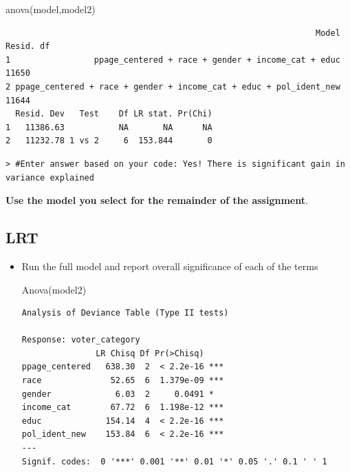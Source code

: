 \documentclass[
  letterpaper,
  DIV=11,
  numbers=noendperiod]{scrartcl}
\newenvironment{Shaded}{\begin{snugshade}}{\end{snugshade}}
\newcommand{\FunctionTok}[1]{\textcolor[rgb]{0.28,0.35,0.67}{#1}}
\newcommand{\NormalTok}[1]{\textcolor[rgb]{0.00,0.23,0.31}{#1}}
\begin{document}
\begin{Shaded}
\begin{Highlighting}[]
\FunctionTok{anova}\NormalTok{(model,model2)}
\end{Highlighting}
\end{Shaded}

\begin{verbatim}
                                                               Model Resid. df
1                 ppage_centered + race + gender + income_cat + educ     11650
2 ppage_centered + race + gender + income_cat + educ + pol_ident_new     11644
  Resid. Dev   Test    Df LR stat. Pr(Chi)
1   11386.63           NA       NA      NA
2   11232.78 1 vs 2     6  153.844       0
\end{verbatim}

\begin{verbatim}
> #Enter answer based on your code: Yes! There is significant gain in variance explained
\end{verbatim}

\textbf{Use the model you select for the remainder of the assignment}.

\subsection{LRT}\label{lrt}

\begin{itemize}
\item
  Run the full model and report overall significance of each of the
  terms

\begin{Shaded}
\begin{Highlighting}[]
\FunctionTok{Anova}\NormalTok{(model2)}
\end{Highlighting}
\end{Shaded}

\begin{verbatim}
Analysis of Deviance Table (Type II tests)

Response: voter_category
               LR Chisq Df Pr(>Chisq)    
ppage_centered   638.30  2  < 2.2e-16 ***
race              52.65  6  1.379e-09 ***
gender             6.03  2     0.0491 *  
income_cat        67.72  6  1.198e-12 ***
educ             154.14  4  < 2.2e-16 ***
pol_ident_new    153.84  6  < 2.2e-16 ***
---
Signif. codes:  0 '***' 0.001 '**' 0.01 '*' 0.05 '.' 0.1 ' ' 1
\end{verbatim}
\end{itemize}
\end{document}
